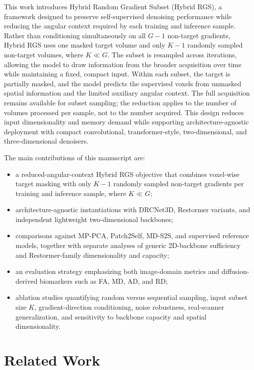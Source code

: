\documentclass[preprint,12pt]{elsarticle}
\begin{document}
This work introduces Hybrid Random Gradient Subset (Hybrid RGS), a framework designed to preserve self-supervised denoising performance while reducing the angular context required by each training and inference sample. Rather than conditioning simultaneously on all $G-1$ non-target gradients, Hybrid RGS uses one masked target volume and only $K-1$ randomly sampled non-target volumes, where $K\ll G$. The subset is resampled across iterations, allowing the model to draw information from the broader acquisition over time while maintaining a fixed, compact input. Within each subset, the target is partially masked, and the model predicts the supervised voxels from unmasked spatial information and the limited auxiliary angular context. The full acquisition remains available for subset sampling; the reduction applies to the number of volumes processed per sample, not to the number acquired. This design reduces input dimensionality and memory demand while supporting architecture-agnostic deployment with compact convolutional, transformer-style, two-dimensional, and three-dimensional denoisers.

The main contributions of this manuscript are:
\begin{itemize}
  \item a reduced-angular-context Hybrid RGS objective that combines voxel-wise target masking with only $K-1$ randomly sampled non-target gradients per training and inference sample, where $K\ll G$;
  \item architecture-agnostic instantiations with DRCNet3D, Restormer variants, and independent lightweight two-dimensional backbones;
  \item comparisons against MP-PCA, Patch2Self, MD-S2S, and supervised reference models, together with separate analyses of generic 2D-backbone sufficiency and Restormer-family dimensionality and capacity;
  \item an evaluation strategy emphasizing both image-domain metrics and diffusion-derived biomarkers such as FA, MD, AD, and RD;
  \item ablation studies quantifying random versus sequential sampling, input subset size $K$, gradient-direction conditioning, noise robustness, real-scanner generalization, and sensitivity to backbone capacity and spatial dimensionality.
\end{itemize}

\section{Related Work}
\end{document}
